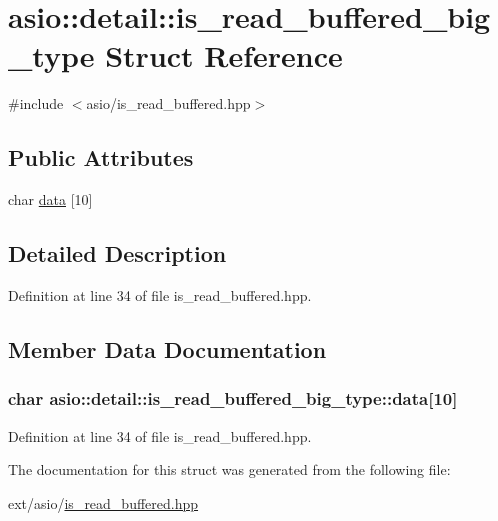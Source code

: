 \hypertarget{structasio_1_1detail_1_1is__read__buffered__big__type}{}\section{asio\+:\+:detail\+:\+:is\+\_\+read\+\_\+buffered\+\_\+big\+\_\+type Struct Reference}
\label{structasio_1_1detail_1_1is__read__buffered__big__type}


{\ttfamily \#include $<$asio/is\+\_\+read\+\_\+buffered.\+hpp$>$}

\subsection*{Public Attributes}
\begin{DoxyCompactItemize}
\item 
char \hyperlink{structasio_1_1detail_1_1is__read__buffered__big__type_a15e5d1fca69c2cc08891a960ba2863af}{data} \mbox{[}10\mbox{]}
\end{DoxyCompactItemize}


\subsection{Detailed Description}


Definition at line 34 of file is\+\_\+read\+\_\+buffered.\+hpp.



\subsection{Member Data Documentation}
\hypertarget{structasio_1_1detail_1_1is__read__buffered__big__type_a15e5d1fca69c2cc08891a960ba2863af}{}
\subsubsection[{data}]{\setlength{\rightskip}{0pt plus 5cm}char asio\+::detail\+::is\+\_\+read\+\_\+buffered\+\_\+big\+\_\+type\+::data\mbox{[}10\mbox{]}}\label{structasio_1_1detail_1_1is__read__buffered__big__type_a15e5d1fca69c2cc08891a960ba2863af}


Definition at line 34 of file is\+\_\+read\+\_\+buffered.\+hpp.



The documentation for this struct was generated from the following file\+:\begin{DoxyCompactItemize}
\item 
ext/asio/\hyperlink{is__read__buffered_8hpp}{is\+\_\+read\+\_\+buffered.\+hpp}\end{DoxyCompactItemize}
